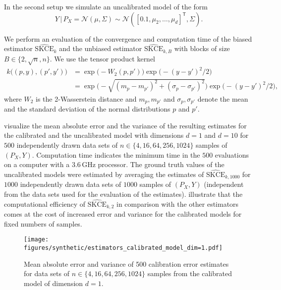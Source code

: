 \documentclass{article}
\begin{document}
In the second setup we simulate an uncalibrated model of the form
\begin{equation*}
    Y \,|\, P_X = \mathcal{N}(\mu, \Sigma) \sim \mathcal{N}([0.1, \mu_2, \ldots, \mu_d]^{\mathsf{T}}, \Sigma).
\end{equation*}

We perform an evaluation of the convergence and computation time of the biased estimator
$\widehat{\mathrm{SKCE}}_k$ and the unbiased estimator $\widehat{\mathrm{SKCE}}_{k,B}$ with
blocks of size $B \in \{2, \sqrt{n}, n\}$. We use the tensor product kernel
\begin{equation*}
\begin{split}
    k\big((p, y), (p', y')\big) &= \exp{\big(- W_2(p, p')\big)} \exp{\big(-(y - y')^2/2\big)} \\
    &= \exp{\bigg(-\sqrt{(m_p - m_{p'})^2 + (\sigma_p - \sigma_{p'})^2}\bigg)} \exp{\big( - (y - y')^2/2\big)},
\end{split}
\end{equation*}
where $W_2$ is the 2-Wasserstein distance and $m_p, m_{p'}$ and $\sigma_p, \sigma_{p'}$
denote the mean and the standard deviation of the normal distributions $p$ and $p'$.

 visualize the mean absolute error and the variance
of the resulting estimates for the calibrated and the uncalibrated model with dimensions
$d = 1$ and $d = 10$ for $500$ independently drawn data sets of $n \in \{4, 16, 64, 256, 1024\}$
samples of $(P_X, Y)$. Computation time indicates the minimum time in the $500$ evaluations
on a computer with a 3.6\,GHz processor. The ground truth values of the uncalibrated models were
estimated by averaging the estimates of $\widehat{\mathrm{SKCE}}_{k,1000}$
for $1000$ independently drawn data sets of $1000$ samples of $(P_X, Y)$ (independent from
the data sets used for the evaluation of the estimates).  illustrate that
the computational efficiency of $\widehat{\mathrm{SKCE}}_{k,2}$ in comparison with the
other estimators comes at the cost of increased error and variance for the calibrated models
for fixed numbers of samples.

\begin{figure}[hpt]
    \begin{center}
        \texttt{[image: figures/synthetic/estimators\_calibrated\_model\_dim=1.pdf]}
        \caption{Mean absolute error and variance of 500 calibration error estimates for
        data sets of $n \in \{4, 16, 64, 256, 1024\}$ samples from the calibrated model
        of dimension $d = 1$.}
        \label{fig:synthetic_estimators_calibrated_1}
    \end{center}
\end{figure}
\end{document}
